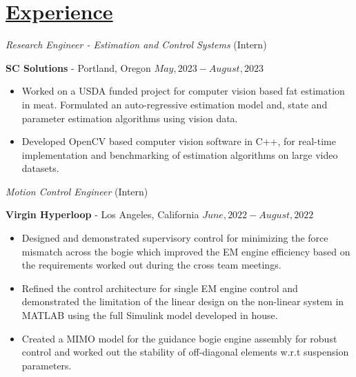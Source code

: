 \section*{\underline{Experience}}
\noindent\textit{Research Engineer  - Estimation and Control Systems} (Intern)

\textbf{SC Solutions} - Portland, Oregon \hfill $May, 2023 - August, 2023$

\begin{itemize}
    \item Worked on a USDA funded project for computer vision based fat estimation in meat. Formulated an auto-regressive estimation model and, state and parameter estimation algorithms using vision data.
    \item Developed OpenCV based computer vision software in C++, for real-time implementation and benchmarking of estimation algorithms on large video datasets.
\end{itemize}

\medskip

\noindent \textit{Motion Control Engineer } (Intern)

\textbf{Virgin Hyperloop} - Los Angeles, California \hfill $June, 2022  - August, 2022$

\begin{itemize}
        \item Designed and demonstrated supervisory control for minimizing the force mismatch across the bogie which
        improved the EM engine efficiency based on the requirements worked out during the cross team meetings.
        \item Refined the control architecture for single EM engine control and demonstrated the limitation of the linear design on the non-linear system in MATLAB using the full Simulink model developed in house.
        \item Created a MIMO model for the guidance bogie engine assembly for robust control and worked out the stability of off-diagonal
        elements w.r.t suspension parameters.
\end{itemize}

